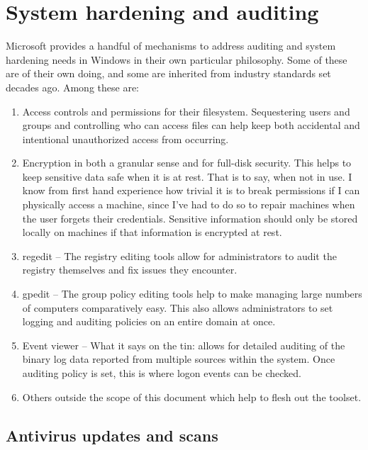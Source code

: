 \hypertarget{system-hardening-and-auditing}{%
\section{System hardening and
auditing}\label{system-hardening-and-auditing}}

Microsoft provides a handful of mechanisms to address auditing and
system hardening needs in Windows in their own particular philosophy.
Some of these are of their own doing, and some are inherited from
industry standards set decades ago. Among these are:

\begin{enumerate}
\def\labelenumi{\arabic{enumi}.}
\item
  Access controls and permissions for their filesystem. Sequestering
  users and groups and controlling who can access files can help keep
  both accidental and intentional unauthorized access from occurring.
\item
  Encryption in both a granular sense and for full-disk security. This
  helps to keep sensitive data safe when it is at rest. That is to say,
  when not in use. I know from first hand experience how trivial it is
  to break permissions if I can physically access a machine, since I've
  had to do so to repair machines when the user forgets their
  credentials. Sensitive information should only be stored locally on
  machines if that information is encrypted at rest.
\item
  regedit -- The registry editing tools allow for administrators to
  audit the registry themselves and fix issues they encounter.
\item
  gpedit -- The group policy editing tools help to make managing large
  numbers of computers comparatively easy. This also allows
  administrators to set logging and auditing policies on an entire
  domain at once.
\item
  Event viewer -- What it says on the tin: allows for detailed auditing
  of the binary log data reported from multiple sources within the
  system. Once auditing policy is set, this is where logon events can be
  checked.
\item
  Others outside the scope of this document which help to flesh out the
  toolset.
\end{enumerate}

\hypertarget{antivirus-updates-and-scans}{%
\subsection{Antivirus updates and
scans}\label{antivirus-updates-and-scans}}

